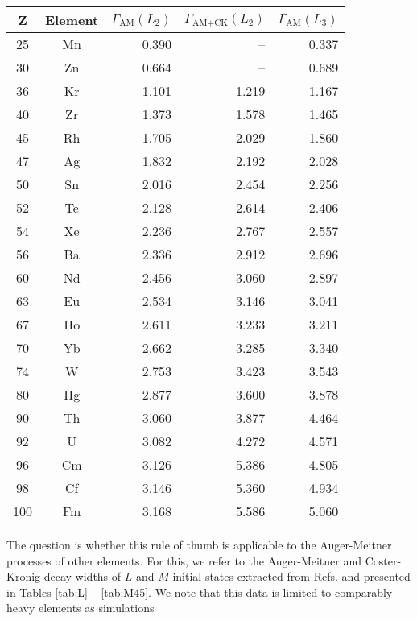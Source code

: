 \documentclass[aps,amssymb,preprint,a4paper,longbibliography]{revtex4}
\begin{document}
{
%
\begin{table*}[htb]
 \caption{Auger-Meitner (AM) decay widths and Coster-Kronig (CK) widths
          of $L_2$ and $L_3$ shells in \unit{eV} extracted from
          Ref. \cite{Chen81}.}
 \begin{tabular}{ccrrr}
 \toprule
 Z & Element & $\Gamma_\text{AM}(L_2)$ & $\Gamma_\text{AM+CK}(L_2)$ & $\Gamma_\text{AM}(L_3)$\\
 \midrule
 25 & Mn & 0.390 &  --   & 0.337 \\
 30 & Zn & 0.664 &  --   & 0.689 \\
 36 & Kr & 1.101 & 1.219 & 1.167 \\
 40 & Zr & 1.373 & 1.578 & 1.465 \\
 45 & Rh & 1.705 & 2.029 & 1.860 \\
 47 & Ag & 1.832 & 2.192 & 2.028 \\
 50 & Sn & 2.016 & 2.454 & 2.256 \\
 52 & Te & 2.128 & 2.614 & 2.406 \\
 54 & Xe & 2.236 & 2.767 & 2.557 \\
 56 & Ba & 2.336 & 2.912 & 2.696 \\
 60 & Nd & 2.456 & 3.060 & 2.897 \\
 63 & Eu & 2.534 & 3.146 & 3.041 \\
 67 & Ho & 2.611 & 3.233 & 3.211 \\
 70 & Yb & 2.662 & 3.285 & 3.340 \\
 74 & W  & 2.753 & 3.423 & 3.543 \\
 80 & Hg & 2.877 & 3.600 & 3.878 \\
 90 & Th & 3.060 & 3.877 & 4.464 \\
 92 & U  & 3.082 & 4.272 & 4.571 \\
 96 & Cm & 3.126 & 5.386 & 4.805 \\
 98 & Cf & 3.146 & 5.360 & 4.934 \\
100 & Fm & 3.168 & 5.586 & 5.060 \\
 \bottomrule
 \end{tabular}
 \label{tab:L}
\end{table*}
The question is whether this rule of thumb is applicable to the Auger-Meitner
processes of other elements. For this, we refer to the Auger-Meitner and
Coster-Kronig decay widths of $L$ and $M$ initial states extracted from Refs.
\cite{Chen81,Chen83,Chen80} and presented in Tables \ref{tab:L} -- \ref{tab:M45}.
We note that this data is limited to comparably heavy elements as simulations
}
\end{document}
